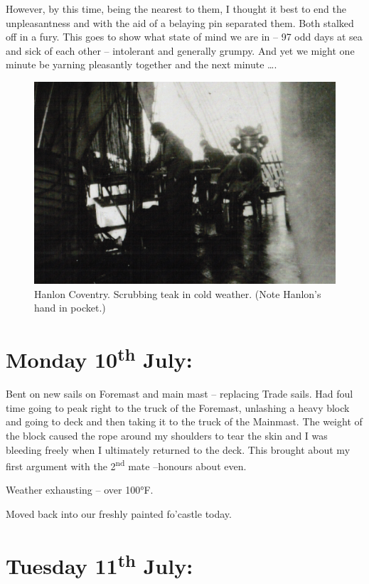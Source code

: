 \documentclass[
  11pt,
  msmallroyalvopaper
]{memoir}
\begin{document}
However, by this time, being the nearest to them, I thought it best to
end the unpleasantness and with the aid of a belaying pin separated
them. Both stalked off in a fury. This goes to show what state of mind
we are in -- 97 odd days at sea and sick of each other -- intolerant and
generally grumpy. And yet we might one minute be yarning pleasantly
together and the next minute \ldots.

\begin{figure}
\centering
\includegraphics{./images/image028.png}
\caption{Hanlon Coventry. Scrubbing teak in cold weather. (Note Hanlon's
hand in pocket.)}
\end{figure}

\hypertarget{monday-10th-july}{%
\section{\texorpdfstring{Monday 10\textsuperscript{th}
July:}{Monday 10th July:}}\label{monday-10th-july}}

Bent on new sails on Foremast and main mast -- replacing Trade sails.
Had foul time going to peak right to the truck of the Foremast,
unlashing a heavy block and going to deck and then taking it to the
truck of the Mainmast. The weight of the block caused the rope around my
shoulders to tear the skin and I was bleeding freely when I ultimately
returned to the deck. This brought about my first argument with the
2\textsuperscript{nd} mate --honours about even.

Weather exhausting -- over 100°F.

Moved back into our freshly painted fo'castle today.

\hypertarget{tuesday-11th-july}{%
\section{\texorpdfstring{Tuesday 11\textsuperscript{th}
July:}{Tuesday 11th July:}}\label{tuesday-11th-july}}
\end{document}
